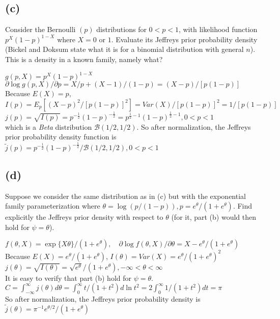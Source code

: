 \documentclass[11pt]{article}
\newcommand{\Beta}{\mathcal{B}}
\newcommand{\ProbS}{\iftrue}
\newcommand{\ProbE}{\fi}
\begin{document}
\subsection*{(c)}
\ProbS
Consider the Bernoulli $(p)$ distributions for $0<p<1$, with likelihood function $p^X(1-p)^{1-X}$ where $X=0$ or $1$. Evaluate its Jeffreys prior probability density (Bickel and Doksum state what it is for a binomial distribution with general $n$). This is a density in a known family, namely what?
\ProbE

$
g(p, X) = p^X (1-p)^{1-X}
$
\\
$
\partial \log g(p, X) / \partial p = X/p + (X-1)/(1-p)
=(X-p)/[p(1-p)]
$
\\
Because $E(X)=p$, \\
$
I(p) = E_p[(X-p)^2/[p(1-p)]^2]=
Var(X)/[p(1-p)]^2 =
1/[p(1-p)]
$
\\
$
j(p) = \sqrt{I(p)} =
p^{-\frac{1}{2}}(1-p)^{-\frac{1}{2}} =
p^{\frac{1}{2}-1}(1-p)^{\frac{1}{2}-1},
0<p<1
$
\\
which is a \emph{Beta} distribution $\Beta(1/2, 1/2)$.
So after normalization, the Jeffreys prior probability density function is
\\
$
\tilde{j}(p)=
p^{-\frac{1}{2}}(1-p)^{-\frac{1}{2}}/\Beta(1/2, 1/2),
0<p<1
$
\subsection*{(d)}
\ProbS
Suppose we consider the same distribution as in (c) but with the exponential family parameterization where $\theta = \log(p/(1-p)), p=e^{\theta}/(1+e^{\theta})$. Find explicitly the Jeffreys prior density with respect to $\theta$ (for it, part (b) would then hold for $\psi = \theta$).
\ProbE

$
f(\theta, X) = \exp\{X\theta\} / (1+e^{\theta})
,\quad
\partial \log f(\theta, X) / \partial \theta = X-e^{\theta}/(1+e^\theta)
$
\\
Because $E(X)=e^{\theta}/(1+e^{\theta})$,
$
I(\theta) = Var(X) = e^\theta / (1+e^\theta)^2
$
\\
$
j(\theta) = \sqrt{I(\theta)} = \sqrt{e^\theta}/(1+e^\theta),
-\infty < \theta < \infty
$
\\
It is easy to verify that part (b) hold for $\psi=\theta$.
\\
$
C = \int_{-\infty}^{\infty} j(\theta) d\theta
= \int_{0}^{\infty} t/(1+t^2) d\ln t^2
= 2 \int_{0}^{\infty} 1/(1+t^2) dt
= \pi
$
\\
So after normalization, the Jeffreys prior probability density is\\
$
\tilde{j}(\theta) = \pi^{-1} e^{\theta/2} / (1+e^\theta)
$
\end{document}
